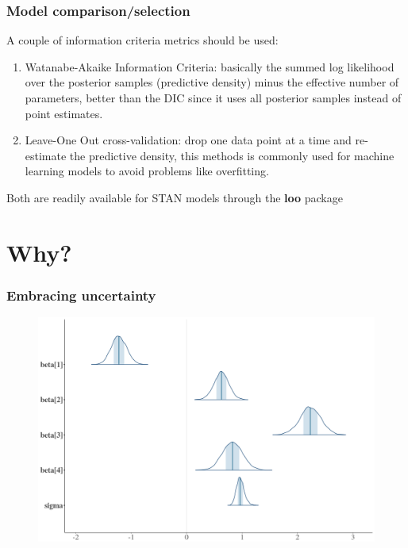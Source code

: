 \documentclass{beamer}
\begin{document}
  \begin{frame}
  \frametitle{\bf Model comparison/selection}
  
  A couple of information criteria metrics should be used:
  
  \begin{enumerate}
   \item Watanabe-Akaike Information Criteria: basically the summed log likelihood over the posterior samples (predictive density) minus the effective number of parameters, better than the DIC since it uses all posterior samples instead of point estimates.
   \item Leave-One Out cross-validation: drop one data point at a time and re-estimate the predictive density, this methods is commonly used for machine learning models to avoid problems like overfitting.
  \end{enumerate}
  
  \vspace*{0.2cm}
  
  Both are readily available for STAN models through the \textbf{loo} package

  
 \end{frame}
 

\section{Why?}
 
  \begin{frame}
  \frametitle{\bf Embracing uncertainty}
  
  \begin{figure}
   \includegraphics[width=\textwidth,height=.7\textheight,keepaspectratio]{posterior-params.png}
  \end{figure}

  
  
 \end{frame}
 
\end{document}
